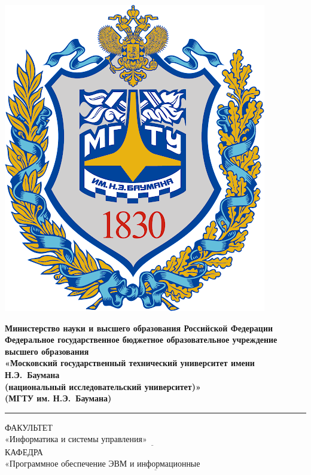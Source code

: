 
\begin{titlepage}
	\fontsize{12pt}{12pt}\selectfont
	\noindent \begin{minipage}{0.15\textwidth}
		\includegraphics[width=\linewidth]{inc/img/bmstu-logo.png}
	\end{minipage}
	\noindent\begin{minipage}{0.9\textwidth}\centering
		\textbf{Министерство науки и высшего образования Российской Федерации}\\
		\textbf{Федеральное государственное бюджетное образовательное учреждение высшего образования}\\
		\textbf{«Московский государственный технический университет имени Н.Э.~Баумана}\\
		\textbf{(национальный исследовательский университет)»}\\
		\textbf{(МГТУ им. Н.Э.~Баумана)}
	\end{minipage}
	
	\noindent\rule{18cm}{3pt}
	\newline\newline
	\noindent ФАКУЛЬТЕТ $\underline{\text{«Информатика и системы управления»~~~~~~~~~~~~~~~~~~~~~~~~~~~~~~~~~~~~~~~~~~~~~~~~~~~~~~~}}$ \newline\newline
	\noindent КАФЕДРА $\underline{\text{«Программное обеспечение ЭВМ и информационные технологии»~~~~~~~~~~~~~~~~~~~~~~~}}$\newline\newline\newline\newline\newline\newline\newline
	

\end{titlepage}
